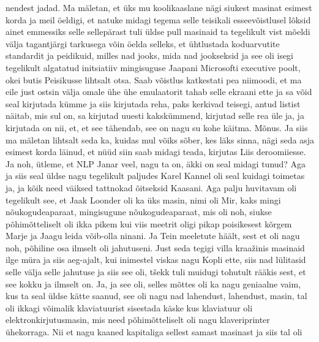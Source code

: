 nendest jadad. Ma mäletan, et üks mu koolikaaslane nägi siukest masinat esimest korda ja meil öeldigi, et natuke midagi tegema selle teisikali esseevõistlusel lõksid ainet emmessiks selle sellepärast tuli üldse pull masinaid ta tegelikult vist mõeldi välja tagantjärgi tarkusega võin öelda selleks, et ühtlustada koduarvutite standardit ja peidikuid, milles nad jooks, mida nad jookseksid ja see oli isegi tegelikult algatatud initsiatiiv mingisuguse Jaapani Microsofti executive poolt, okei butis Peisikusse lihtsalt otsa. Saab võistlus katkestati pea niimoodi, et ma eile just ostsin välja omale ühe ühe emulaatorit tahab selle ekraani ette ja sa võid seal kirjutada kümme ja siis kirjutada reha, paks kerkivad teisegi, antud listist näitab, mis sul on, sa kirjutad uuesti kakskümmend, kirjutad selle rea üle ja, ja kirjutada on nii, et, et see tähendab, see on nagu su kohe käitma. Mõnus. Ja siis ma mäletan lihtsalt seda ka, kuidas mul võiks sõber, kes läks sinna, nägi seda asja esimest korda läinud, et nüüd siin saab midagi teada, kirjutas Liis deroomiiesse.
Ja noh, ütleme, et NLP Janar veel, nagu ta on, äkki on seal midagi tunud?
Aga ja siis seal üldse nagu tegelikult paljudes Karel Kannel oli seal kuidagi toimetas ja, ja kõik need väiksed tattnokad õitseksid Kaasani. Aga palju huvitavam oli tegelikult see, et Jaak Loonder oli ka üks masin, nimi oli Mir, kaks mingi nõukogudeaparaat, mingisugune nõukogudeaparaat, mis oli noh, siukse põhimõtteliselt oli ikka pikem kui viis meetrit oligi pikap poisikesest kõrgem Marje ja Jaagu leida võib-olla ninani.
Ja Tein meeletute häält, sest et oli nagu noh, põhiline osa ilmselt oli jahutuseni. Just seda tegigi villa kraažinis masinaid ilge müra ja siis aeg-ajalt, kui inimestel viskas nagu Kopli ette, siis nad lülitasid selle välja selle jahutuse ja siis see oli, tšekk tuli muidugi tohutult rääkis sest, et see kokku ja ilmselt on. Ja, ja see oli, selles mõttes oli ka nagu geniaalne vaim, kus ta seal üldse kätte saanud, see oli nagu nad lahendust, lahendust, masin, tal oli ikkagi võimalik klaviatuurist sisestada käske kus klaviatuur oli elektronkirjutusmasin, mis need põhimõtteliselt oli nagu klaveriprinter ühekorraga. Nii et nagu kaaned kapitaliga sellest samast masinast ja siis tal oli
